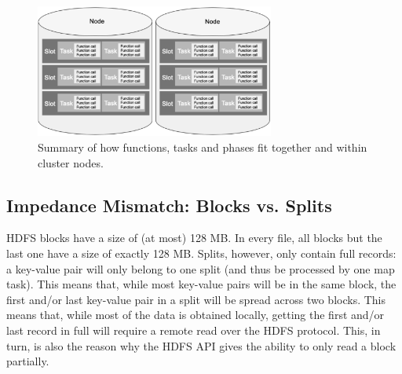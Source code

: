 \begin{figure}[h]
    \centering
    \includegraphics[width=0.7\textwidth]{Figures/MapReduceNodes.png}
    \caption{Summary of how functions, tasks and phases fit together and within cluster nodes.}
\end{figure}

\subsection{Impedance Mismatch: Blocks vs. Splits}
HDFS blocks have a size of (at most) 128 MB. In every file, all blocks but the last one have a size of exactly 128 MB. Splits, however, only contain full records: a key-value pair will only belong to one split (and thus be processed by one map task). This means that, while most key-value pairs will be in the same block, the first and/or last key-value pair in a split will be spread across two blocks. This means that, while most of the data is obtained locally, getting the first and/or last record in full will require a remote read over the HDFS protocol. This, in turn, is also the reason why the HDFS API gives the ability to only read a block partially.